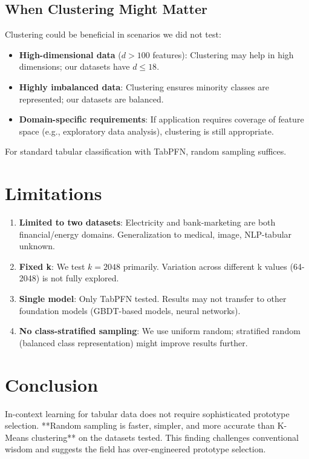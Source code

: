 \documentclass[11pt,a4paper]{article}
\begin{document}
\subsection{When Clustering Might Matter}

Clustering could be beneficial in scenarios we did not test:
\begin{itemize}
\item \textbf{High-dimensional data} ($d > 100$ features): Clustering may help in high dimensions; our datasets have $d \le 18$.
\item \textbf{Highly imbalanced data}: Clustering ensures minority classes are represented; our datasets are balanced.
\item \textbf{Domain-specific requirements}: If application requires coverage of feature space (e.g., exploratory data analysis), clustering is still appropriate.
\end{itemize}

For standard tabular classification with TabPFN, random sampling suffices.

\section{Limitations}

\begin{enumerate}
\item \textbf{Limited to two datasets}: Electricity and bank-marketing are both financial/energy domains. Generalization to medical, image, NLP-tabular unknown.

\item \textbf{Fixed k}: We test $k=2048$ primarily. Variation across different k values (64-2048) is not fully explored.

\item \textbf{Single model}: Only TabPFN tested. Results may not transfer to other foundation models (GBDT-based models, neural networks).

\item \textbf{No class-stratified sampling}: We use uniform random; stratified random (balanced class representation) might improve results further.
\end{enumerate}

\section{Conclusion}

In-context learning for tabular data does not require sophisticated prototype selection. **Random sampling is faster, simpler, and more accurate than K-Means clustering** on the datasets tested. This finding challenges conventional wisdom and suggests the field has over-engineered prototype selection.
\end{document}
